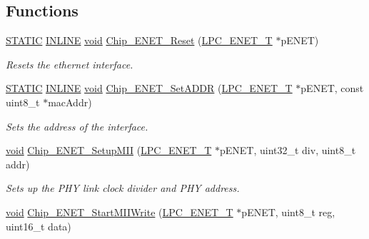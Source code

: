 \subsection*{Functions}
\begin{DoxyCompactItemize}
\item 
\hyperlink{group__LPC__Types__Public__Macros_ga10b2d890d871e1489bb02b7e70d9bdfb}{S\-T\-A\-T\-I\-C} \hyperlink{group__LPC__Types__Public__Types_ga2eb6f9e0395b47b8d5e3eeae4fe0c116}{I\-N\-L\-I\-N\-E} \hyperlink{Paradigm_2Tern__EE_2small_2portmacro_8h_a14d32f8130d3c0b212cfc751730b5b49}{void} \hyperlink{group__ENET__17XX__40XX_gae6567d8fb1d427ecf30ce65f48a074b4}{Chip\-\_\-\-E\-N\-E\-T\-\_\-\-Reset} (\hyperlink{structLPC__ENET__T}{L\-P\-C\-\_\-\-E\-N\-E\-T\-\_\-\-T} $\ast$p\-E\-N\-E\-T)
\begin{DoxyCompactList}\small\item\em Resets the ethernet interface. \end{DoxyCompactList}\item 
\hyperlink{group__LPC__Types__Public__Macros_ga10b2d890d871e1489bb02b7e70d9bdfb}{S\-T\-A\-T\-I\-C} \hyperlink{group__LPC__Types__Public__Types_ga2eb6f9e0395b47b8d5e3eeae4fe0c116}{I\-N\-L\-I\-N\-E} \hyperlink{Paradigm_2Tern__EE_2small_2portmacro_8h_a14d32f8130d3c0b212cfc751730b5b49}{void} \hyperlink{group__ENET__17XX__40XX_ga6d915db1de0ba98ac0cdb1df8c59515b}{Chip\-\_\-\-E\-N\-E\-T\-\_\-\-Set\-A\-D\-D\-R} (\hyperlink{structLPC__ENET__T}{L\-P\-C\-\_\-\-E\-N\-E\-T\-\_\-\-T} $\ast$p\-E\-N\-E\-T, const uint8\-\_\-t $\ast$mac\-Addr)
\begin{DoxyCompactList}\small\item\em Sets the address of the interface. \end{DoxyCompactList}\item 
\hyperlink{Paradigm_2Tern__EE_2small_2portmacro_8h_a14d32f8130d3c0b212cfc751730b5b49}{void} \hyperlink{group__ENET__17XX__40XX_ga9694421dbd0f331895fcf514fd18c938}{Chip\-\_\-\-E\-N\-E\-T\-\_\-\-Setup\-M\-I\-I} (\hyperlink{structLPC__ENET__T}{L\-P\-C\-\_\-\-E\-N\-E\-T\-\_\-\-T} $\ast$p\-E\-N\-E\-T, uint32\-\_\-t div, uint8\-\_\-t addr)
\begin{DoxyCompactList}\small\item\em Sets up the P\-H\-Y link clock divider and P\-H\-Y address. \end{DoxyCompactList}\item 
\hyperlink{Paradigm_2Tern__EE_2small_2portmacro_8h_a14d32f8130d3c0b212cfc751730b5b49}{void} \hyperlink{group__ENET__17XX__40XX_gade9f31bbc04119bc06638fd8ce874f73}{Chip\-\_\-\-E\-N\-E\-T\-\_\-\-Start\-M\-I\-I\-Write} (\hyperlink{structLPC__ENET__T}{L\-P\-C\-\_\-\-E\-N\-E\-T\-\_\-\-T} $\ast$p\-E\-N\-E\-T, uint8\-\_\-t reg, uint16\-\_\-t data)

\end{DoxyCompactItemize}
